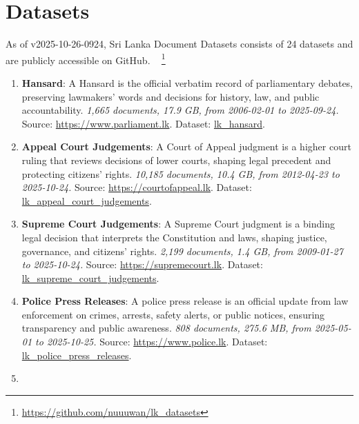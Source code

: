 \documentclass[10pt,a4paper]{article}%
\begin{document}
%
\section{Datasets}%
\label{sec:Datasets}%
As of v2025-10-26-0924, Sri Lanka Document Datasets
  consists of 24 datasets
 and are publicly accessible on GitHub.%
~%
\footnote{\href{https://github.com/nuuuwan/lk\_datasets}{https://github.com/nuuuwan/lk\_datasets}}%

%
\begin{enumerate}%
\item%
\textbf{Hansard}: A Hansard is the official verbatim record of parliamentary debates, preserving lawmakers’ words and decisions for history, law, and public accountability.\textit{ 1,665 documents, 17.9 GB, from 2006{-}02{-}01 to 2025{-}09{-}24.} Source: \href{https://www.parliament.lk}{https://www.parliament.lk}. Dataset: \href{https://github.com/nuuuwan/lk\_hansard/tree/data/data/lk\_hansard}{lk\_hansard}.%
\item%
\textbf{Appeal Court Judgements}: A Court of Appeal judgment is a higher court ruling that reviews decisions of lower courts, shaping legal precedent and protecting citizens’ rights.\textit{ 10,185 documents, 10.4 GB, from 2012{-}04{-}23 to 2025{-}10{-}24.} Source: \href{https://courtofappeal.lk}{https://courtofappeal.lk}. Dataset: \href{https://github.com/nuuuwan/lk\_appeal\_court\_judgements/tree/data/data/lk\_appeal\_court\_judgements}{lk\_appeal\_court\_judgements}.%
\item%
\textbf{Supreme Court Judgements}: A Supreme Court judgment is a binding legal decision that interprets the Constitution and laws, shaping justice, governance, and citizens’ rights.\textit{ 2,199 documents, 1.4 GB, from 2009{-}01{-}27 to 2025{-}10{-}24.} Source: \href{https://supremecourt.lk}{https://supremecourt.lk}. Dataset: \href{https://github.com/nuuuwan/lk\_supreme\_court\_judgements/tree/data/data/lk\_supreme\_court\_judgements}{lk\_supreme\_court\_judgements}.%
\item%
\textbf{Police Press Releases}: A police press release is an official update from law enforcement on crimes, arrests, safety alerts, or public notices, ensuring transparency and public awareness.\textit{ 808 documents, 275.6 MB, from 2025{-}05{-}01 to 2025{-}10{-}25.} Source: \href{https://www.police.lk}{https://www.police.lk}. Dataset: \href{https://github.com/nuuuwan/lk\_police\_press\_releases/tree/data/data/lk\_police\_press\_releases}{lk\_police\_press\_releases}.%
\item%

\end{enumerate}
\end{document}
